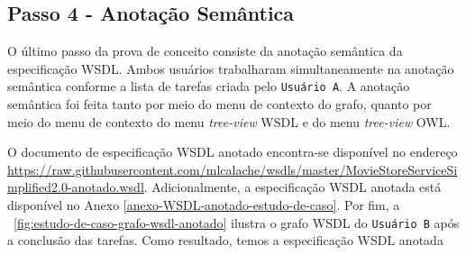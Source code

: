 \subsection{Passo 4 - Anotação Semântica}\label{estudo-de-caso-passo4-anotacao-semantica}

O último passo da prova de conceito consiste da anotação semântica da especificação WSDL.
Ambos usuários trabalharam simultaneamente na anotação semântica conforme a lista de tarefas criada pelo \texttt{Usuário A}. A anotação semântica foi feita tanto por meio do menu de contexto do grafo, quanto por meio do menu de contexto do menu \textit{tree-view} WSDL e do menu \textit{tree-view} OWL. 

O documento de especificação WSDL anotado encontra-se disponível no endereço \url{https://raw.githubusercontent.com/mlcalache/wsdls/master/MovieStoreServiceSimplified2.0-anotado.wsdl}. Adicionalmente, a especificação WSDL anotada está disponível no Anexo \ref{anexo-WSDL-anotado-estudo-de-caso}. Por fim, a \figurename~\ref{fig:estudo-de-caso-grafo-wsdl-anotado} ilustra o grafo WSDL do \texttt{Usuário B} após a conclusão das tarefas. Como resultado, temos a especificação WSDL anotada 

